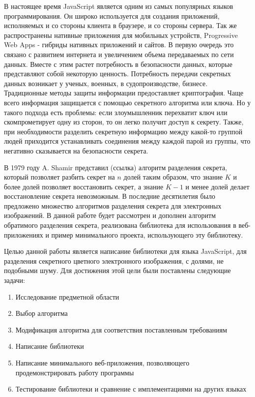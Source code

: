 \documentclass[a4paper,article,14pt]{extarticle}
\begin{document}


\tableofcontents
\pagebreak

В настоящее время JavaScript является одним из самых популярных языков программирования. Он широко используется для создания приложений,
исполняемых и со стороны клиента в браузере, и со стороны сервера. Так же распространены нативные приложения для мобильных устройств, 
Progressive Web Apps - гибриды нативных приложений и сайтов. В первую очередь это связано с развитием интернета и увеличением объема
передаваемых по сети данных. Вместе с этим растет потребность в безопасности данных, которые представляют собой некоторую ценность.
Потребность передачи секретных данных возникает у ученых, военных, в судопроизводстве, бизнесе. 
Традиционные методы защиты информации предоставляет криптография. Чаще всего информация защищается с помощью секретного алгоритма или ключа.
Но у такого подхода есть проблемы: если злоумышленник перехватит ключ или скомпрометирует одну из сторон, то он легко получит доступ к секрету.
Также, при необходимости разделить секретную информацию между какой-то группой людей приходится устанавливать соединения между каждой парой из группы,
что негативно сказывается на безопасности секрета.

В 1979 году A. Shamir представил (ссылка) алгоритм 
разделения секрета, который позволяет разбить секрет на $n$ долей таким образом, что знание $K$ и более долей позволяет восстановить 
секрет, а знание $K-1$ и менее долей делает восстановление секрета невозможным. В последние десятилетия было предложено множество 
алгоритмов разделения секрета для электронных изображений. В данной работе будет рассмотрен и дополнен алгоритм обратимого 
разделения секрета, реализована библиотека для использования в веб-приложениях и пример минимального проекта, использующего эту 
библиотеку.

\newpage
{}

Целью данной работы является написание библиотеки для языка JavaScript, для разделения секретного цветного электронного изображения,
с долями, не подобными шуму. Для достижения этой цели были поставлены следующие задачи:
\begin{enumerate}
    \item Исследование предметной области
    \item Выбор алгоритма
    \item Модификация алгоритма для соответствия поставленным требованиям
    \item Написание библиотеки
    \item Написание минимального веб-приложения, позволяющего продемонстрировать работу программы
    \item Тестирование библиотеки и сравнение с имплементациями на других языках 
\end{enumerate}
\end{document}

